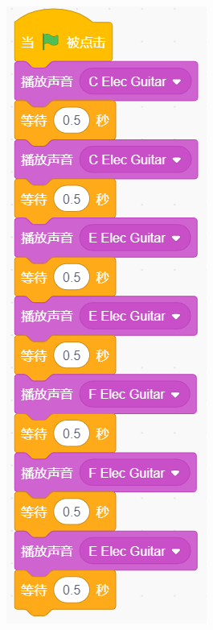 \documentclass[10pt, a4paper]{article}
\begin{document}
\begin{enumerate}
\begin{figure}[htbp]
\begin{minipage}{.12\textwidth}
                \includegraphics[width=\textwidth]{5-1.png}

\end{minipage}
\end{figure}
\end{enumerate}
\end{document}
